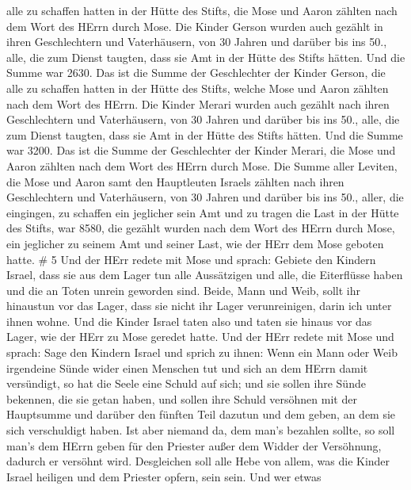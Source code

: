 alle zu schaffen hatten in der Hütte des Stifts, die Mose und Aaron
zählten nach dem Wort des HErrn durch Mose.  Die Kinder
Gerson wurden auch gezählt in ihren Geschlechtern und Vaterhäusern,
 von 30 Jahren und darüber bis ins 50., alle, die zum
Dienst taugten, dass sie Amt in der Hütte des Stifts hätten.
 Und die Summe war 2630.  Das ist die Summe
der Geschlechter der Kinder Gerson, die alle zu schaffen hatten in der
Hütte des Stifts, welche Mose und Aaron zählten nach dem Wort des HErrn.
 Die Kinder Merari wurden auch gezählt nach ihren
Geschlechtern und Vaterhäusern,  von 30 Jahren und darüber
bis ins 50., alle, die zum Dienst taugten, dass sie Amt in der Hütte des
Stifts hätten.  Und die Summe war 3200.  Das
ist die Summe der Geschlechter der Kinder Merari, die Mose und Aaron
zählten nach dem Wort des HErrn durch Mose.  Die Summe
aller Leviten, die Mose und Aaron samt den Hauptleuten Israels zählten
nach ihren Geschlechtern und Vaterhäusern,  von 30 Jahren
und darüber bis ins 50., aller, die eingingen, zu schaffen ein jeglicher
sein Amt und zu tragen die Last in der Hütte des Stifts, 
war 8580,  die gezählt wurden nach dem Wort des HErrn durch
Mose, ein jeglicher zu seinem Amt und seiner Last, wie der HErr dem Mose
geboten hatte. \# 5  Und der HErr redete mit Mose und
sprach:  Gebiete den Kindern Israel, dass sie aus dem Lager
tun alle Aussätzigen und alle, die Eiterflüsse haben und die an Toten
unrein geworden sind.  Beide, Mann und Weib, sollt ihr
hinaustun vor das Lager, dass sie nicht ihr Lager verunreinigen, darin
ich unter ihnen wohne.  Und die Kinder Israel taten also und
taten sie hinaus vor das Lager, wie der HErr zu Mose geredet hatte.
 Und der HErr redete mit Mose und sprach:  Sage
den Kindern Israel und sprich zu ihnen: Wenn ein Mann oder Weib
irgendeine Sünde wider einen Menschen tut und sich an dem HErrn damit
versündigt, so hat die Seele eine Schuld auf sich;  und sie
sollen ihre Sünde bekennen, die sie getan haben, und sollen ihre Schuld
versöhnen mit der Hauptsumme und darüber den fünften Teil dazutun und
dem geben, an dem sie sich verschuldigt haben.  Ist aber
niemand da, dem man's bezahlen sollte, so soll man's dem HErrn geben für
den Priester außer dem Widder der Versöhnung, dadurch er versöhnt wird.
 Desgleichen soll alle Hebe von allem, was die Kinder Israel
heiligen und dem Priester opfern, sein sein.  Und wer etwas
